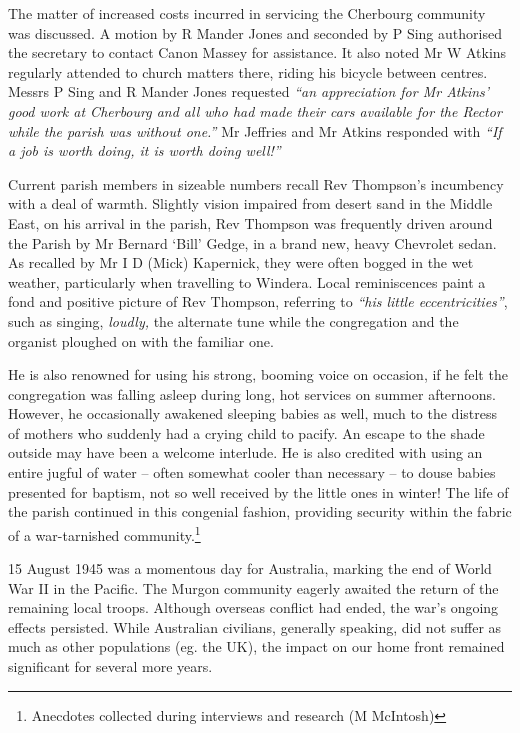 The matter of increased costs incurred in servicing the Cherbourg community was discussed. A motion by R Mander Jones and seconded by P Sing authorised the secretary to contact Canon Massey for assistance. It also noted Mr W Atkins regularly attended to church matters there, riding his bicycle between centres. Messrs P Sing and R Mander Jones requested \emph{``an appreciation for Mr Atkins' good work at Cherbourg and all who had made their cars available for the Rector while the parish was without one.''} Mr Jeffries and Mr Atkins responded with \emph{``If a job is worth doing, it is worth doing well!''}



Current parish members in sizeable numbers recall Rev Thompson's incumbency with a deal of warmth. Slightly vision impaired from desert sand in the Middle East, on his arrival in the parish, Rev Thompson was frequently driven around the Parish by Mr Bernard `Bill' Gedge, in a brand new, heavy Chevrolet sedan. As recalled by Mr I D (Mick) Kapernick, they were often bogged in the wet weather, particularly when travelling to Windera. Local reminiscences paint a fond and positive picture of Rev Thompson, referring to \emph{``his little eccentricities''}, such as singing, \emph{loudly,} the alternate tune while the congregation and the organist ploughed on with the familiar one.



He is also renowned for using his strong, booming voice on occasion, if he felt the congregation was falling asleep during long, hot services on summer afternoons. However, he occasionally awakened sleeping babies as well, much to the distress of mothers who suddenly had a crying child to pacify. An escape to the shade outside may have been a welcome interlude. He is also credited with using an entire jugful of water -- often somewhat cooler than necessary -- to douse babies presented for baptism, not so well received by the little ones in winter! The life of the parish continued in this congenial fashion, providing security within the fabric of a war-tarnished community.\footnote{Anecdotes collected during interviews and research (M McIntosh)}


15 August 1945 was a momentous day for Australia, marking the end of World War II in the Pacific. The Murgon community eagerly awaited the return of the remaining local troops. Although overseas conflict had ended, the war's ongoing effects persisted. While Australian civilians, generally speaking, did not suffer as much as other populations (eg. the UK), the impact on our home front remained significant for several more years.










